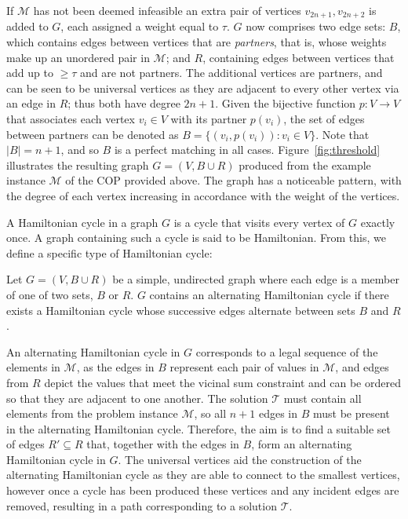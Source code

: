 \documentclass[authoryear]{elsarticle}
\begin{document}
If $\mathcal{M}$ has not been deemed infeasible an extra pair of vertices $v_{2n+1}, v_{2n+2}$ is added to $G$, each assigned a weight equal to $\tau$. $G$ now comprises two edge sets: $B$, which contains edges between vertices that are \emph{partners}, that is, whose weights make up an unordered pair in $\mathcal{M}$; and $R$, containing edges between vertices that add up to $\geq \tau$ and are not partners. The additional vertices are partners, and can be seen to be universal vertices as they are adjacent to every other vertex via an edge in $R$; thus both have degree $2n+1$. Given the bijective function $p : V \to V$ that associates each vertex $v_i \in V$ with its partner $p(v_i)$, the set of edges between partners can be denoted as $B = \{(v_i, p(v_i)) : v_i \in V\}$. Note that $|B| = n+1$, and so $B$ is a perfect matching in all cases. Figure~\ref{fig:threshold} illustrates the resulting graph $G = (V, B \cup R)$ produced from the example instance $\mathcal{M}$ of the COP provided above. The graph has a noticeable pattern, with the degree of each vertex increasing in accordance with the weight of the vertices. 

A Hamiltonian cycle in a graph $G$ is a cycle that visits every vertex of $G$ exactly once. A graph containing such a cycle is said to be Hamiltonian. From this, we define a specific type of Hamiltonian cycle:

\begin{definition} %
	\label{defn:althamcycle}
	Let $G = (V, B \cup R)$ be a simple, undirected graph where each edge is a member of one of two sets, $B$ or $R$. $G$ contains an alternating Hamiltonian cycle if there exists a Hamiltonian cycle whose successive edges alternate between sets $B$ and $R$.
\end{definition}

\noindent An alternating Hamiltonian cycle in $G$ corresponds to a legal sequence of the elements in $\mathcal{M}$, as the edges in $B$ represent each pair of values in $\mathcal{M}$, and edges from $R$ depict the values that meet the vicinal sum constraint and can be ordered so that they are adjacent to one another. The solution $\mathcal{T}$ must contain all elements from the problem instance $\mathcal{M}$, so all $n+1$ edges in $B$ must be present in the alternating Hamiltonian cycle. Therefore, the aim is to find a suitable set of edges $R' \subseteq R$ that, together with the edges in $B$, form an alternating Hamiltonian cycle in $G$. The universal vertices aid the construction of the alternating Hamiltonian cycle as they are able to connect to the smallest vertices, however once a cycle has been produced these vertices and any incident edges are removed, resulting in a path corresponding to a solution $\mathcal{T}$.
\end{document}
